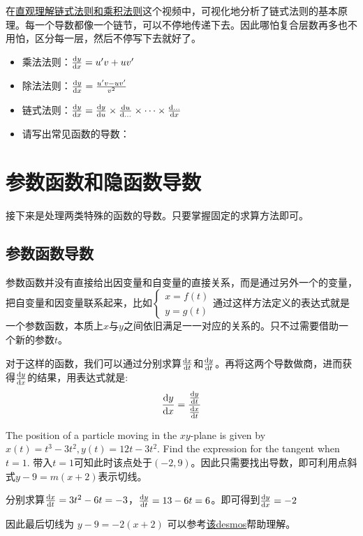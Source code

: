 在\href{https://www.bilibili.com/video/BV1Sx411m7Zz}{直观理解链式法则和乘积法则}这个视频中，可视化地分析了链式法则的基本原理。每一个导数都像一个链节，可以不停地传递下去。因此哪怕复合层数再多也不用怕，区分每一层，然后不停写下去就好了。

\begin{SummBox}
\begin{itemize}
\item 乘法法则：$\frac{{\mathrm{d}} y}{{\mathrm{d}} x}=u'v + uv'$
\item 除法法则：$\frac{{\mathrm{d}} y}{{\mathrm{d}} x}=\frac{u'v-uv'}{v^2}$
\item 链式法则：$\frac{{\mathrm{d}} y}{{\mathrm{d}} x}=\frac{{\mathrm{d}} y}{{\mathrm{d}} u}\times \frac{{\mathrm{d}} u}{{\mathrm{d}} \ldots}\times \cdots \times \frac{{\mathrm{d}} \ldots}{{\mathrm{d}} x}$
\item 请写出常见函数的导数：
\vspace{5 em}
\end{itemize}
\end{SummBox}
\clearpage

\section{参数函数和隐函数导数}
接下来是处理两类特殊的函数的导数。只要掌握固定的求算方法即可。
\subsection*{参数函数导数}
参数函数并没有直接给出因变量和自变量的直接关系，而是通过另外一个的变量，把自变量和因变量联系起来，比如$\begin{cases}
x=f(t)\\
y=g(t)
\end{cases}$通过这样方法定义的表达式就是一个参数函数，本质上$x$与$y$之间依旧满足一一对应的关系的。只不过需要借助一个新的参数$t$。

对于这样的函数，我们可以通过分别求算$\frac{{\mathrm{d}} x}{{\mathrm{d}} t}$和$\frac{{\mathrm{d}} y}{{\mathrm{d}} t}$。再将这两个导数做商，进而获得$\frac{{\mathrm{d}} y}{{\mathrm{d}} x}$的结果，用表达式就是:
\[
	\frac{{\mathrm{d}} y}{{\mathrm{d}} x}=\frac{\frac{{\mathrm{d}} y}{{\mathrm{d}} t}}{\frac{{\mathrm{d}} x}{{\mathrm{d}} t}}
\]
\begin{ExampleBox}
The position of a particle moving in the $xy$-plane is given by $x(t)=t^3-3t^2 , y(t)=12t-3t^2$. Find the expression for the tangent when $t=1$.
\tcblower
带入$t=1$可知此时该点处于$(-2,9)$。因此只需要找出导数，即可利用点斜式$y-9=m(x+2)$表示切线。

分别求算$\frac{{\mathrm{d}} x}{{\mathrm{d}} t}=3t^2-6t=-3$，$\frac{{\mathrm{d}} y}{{\mathrm{d}} t}=13-6t=6$。即可得到$\frac{{\mathrm{d}} y}{{\mathrm{d}} x}=-2$

因此最后切线为 $y-9=-2(x+2)$
可以参考\href{https://www.desmos.com/calculator/sbvuiwhorn}{该desmos}帮助理解。
\end{ExampleBox}

